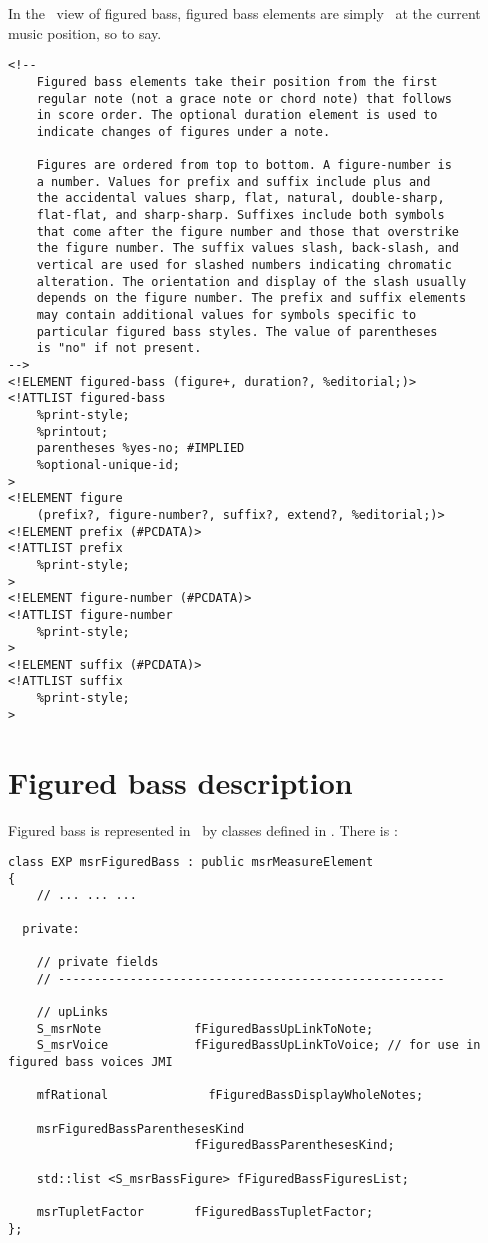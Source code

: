 In the \mxml\ view of figured bass, figured bass elements are simply \drawn\ at the current music position, so to say.
\begin{lstlisting}[language=Terminal]
<!--
	Figured bass elements take their position from the first
	regular note (not a grace note or chord note) that follows
	in score order. The optional duration element is used to
	indicate changes of figures under a note.

	Figures are ordered from top to bottom. A figure-number is
	a number. Values for prefix and suffix include plus and
	the accidental values sharp, flat, natural, double-sharp,
	flat-flat, and sharp-sharp. Suffixes include both symbols
	that come after the figure number and those that overstrike
	the figure number. The suffix values slash, back-slash, and
	vertical are used for slashed numbers indicating chromatic
	alteration. The orientation and display of the slash usually
	depends on the figure number. The prefix and suffix elements
	may contain additional values for symbols specific to
	particular figured bass styles. The value of parentheses
	is "no" if not present.
-->
<!ELEMENT figured-bass (figure+, duration?, %editorial;)>
<!ATTLIST figured-bass
    %print-style;
    %printout;
    parentheses %yes-no; #IMPLIED
    %optional-unique-id;
>
<!ELEMENT figure
	(prefix?, figure-number?, suffix?, extend?, %editorial;)>
<!ELEMENT prefix (#PCDATA)>
<!ATTLIST prefix
    %print-style;
>
<!ELEMENT figure-number (#PCDATA)>
<!ATTLIST figure-number
    %print-style;
>
<!ELEMENT suffix (#PCDATA)>
<!ATTLIST suffix
    %print-style;
>
\end{lstlisting}


\section{Figured bass description}\label{Figured bass description}

Figured bass is represented in \msrRepr\ by classes defined in . There is :
\begin{lstlisting}[language=CPlusPlus]
class EXP msrFiguredBass : public msrMeasureElement
{
	// ... ... ...

  private:

    // private fields
    // ------------------------------------------------------

    // upLinks
    S_msrNote             fFiguredBassUpLinkToNote;
    S_msrVoice            fFiguredBassUpLinkToVoice; // for use in figured bass voices JMI

    mfRational              fFiguredBassDisplayWholeNotes;

    msrFiguredBassParenthesesKind
                          fFiguredBassParenthesesKind;

    std::list <S_msrBassFigure> fFiguredBassFiguresList;

    msrTupletFactor       fFiguredBassTupletFactor;
};
\end{lstlisting}

